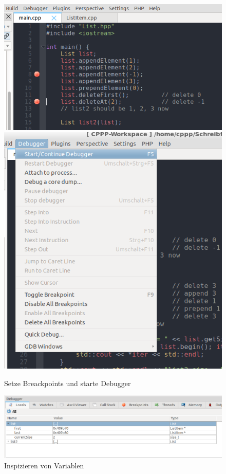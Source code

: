 \begin{figure}
	\centering
	\includegraphics[width=.6\textwidth]{02_memory/figures/breakpoints.png}
	\includegraphics[width=.3\textwidth]{02_memory/figures/start_debugger.png}
	\caption{Setze Breackpoints und starte Debugger}
	\label{fig:breakpoints}
\end{figure}


\begin{figure}
	\centering
	\includegraphics[width=.9\textwidth]{02_memory/figures/locals_view.png}
	\caption{Inspizieren von Variablen}
	\label{fig:locals_view}
\end{figure}


